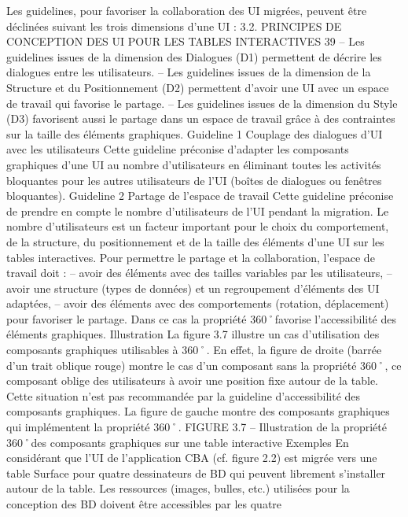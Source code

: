 \documentclass{article}
\begin{document}
Les guidelines, pour favoriser la collaboration des UI migr\'{e}es, peuvent \^{e}tre d\'{e}clin\'{e}es suivant les
trois dimensions d’une UI :
3.2. PRINCIPES DE CONCEPTION DES UI POUR LES TABLES INTERACTIVES
39
– Les guidelines issues de la dimension des Dialogues (D1) permettent de d\'{e}crire les dialogues
entre les utilisateurs.
– Les guidelines issues de la dimension de la Structure et du Positionnement (D2) permettent
d’avoir une UI avec un espace de travail qui favorise le partage.
– Les guidelines issues de la dimension du Style (D3) favorisent aussi le partage dans un espace
de travail gr\^{a}ce \`{a} des contraintes sur la taille des \'{e}l\'{e}ments graphiques.
Guideline 1 Couplage des dialogues d’UI avec les utilisateurs
Cette guideline pr\'{e}conise d’adapter les composants graphiques d’une UI au
nombre d’utilisateurs en \'{e}liminant toutes les activit\'{e}s bloquantes pour les autres
utilisateurs de l’UI (bo\^{i}tes de dialogues ou fen\^{e}tres bloquantes).
Guideline 2 Partage de l’espace de travail
Cette guideline pr\'{e}conise de prendre en compte le nombre d’utilisateurs de l’UI
pendant la migration. Le nombre d’utilisateurs est un facteur important pour le
choix du comportement, de la structure, du positionnement et de la taille des
\'{e}l\'{e}ments d’une UI sur les tables interactives. Pour permettre le partage et la collaboration, l’espace de travail doit :
– avoir des \'{e}l\'{e}ments avec des tailles variables par les utilisateurs,
– avoir une structure (types de donn\'{e}es) et un regroupement d’\'{e}l\'{e}ments des UI
adapt\'{e}es,
– avoir des \'{e}l\'{e}ments avec des comportements (rotation, d\'{e}placement) pour favoriser le partage. Dans ce cas la propri\'{e}t\'{e} 360˚favorise l’accessibilit\'{e} des \'{e}l\'{e}ments graphiques.
Illustration
La ﬁgure 3.7 illustre un cas d’utilisation des composants graphiques utilisables \`{a} 360˚.
En effet, la ﬁgure de droite (barr\'{e}e d’un trait oblique rouge) montre le cas d’un composant sans la
propri\'{e}t\'{e} 360˚, ce composant oblige des utilisateurs \`{a} avoir une position ﬁxe autour de la table. Cette
situation n’est pas recommand\'{e}e par la guideline d’accessibilit\'{e} des composants graphiques.
La ﬁgure de gauche montre des composants graphiques qui impl\'{e}mentent la propri\'{e}t\'{e} 360˚.
FIGURE 3.7 – Illustration de la propri\'{e}t\'{e} 360˚des composants graphiques sur une table interactive
Exemples
En consid\'{e}rant que l’UI de l’application CBA (cf. ﬁgure 2.2) est migr\'{e}e vers une table
Surface pour quatre dessinateurs de BD qui peuvent librement s’installer autour de la table. Les ressources (images, bulles, etc.) utilis\'{e}es pour la conception des BD doivent \^{e}tre accessibles par les quatre
\end{document}
